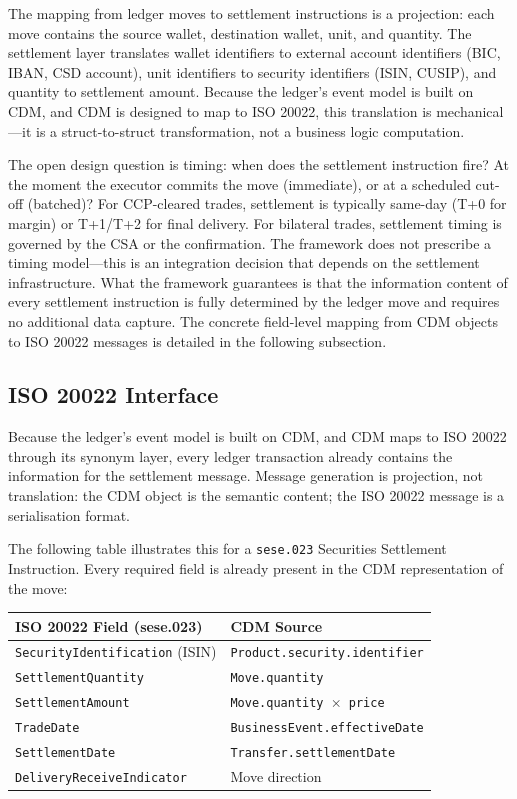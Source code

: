 \documentclass[11pt,a4paper]{article}
\begin{document}
The mapping from ledger moves to settlement instructions is a projection: each move contains the source wallet, destination wallet, unit, and quantity. The settlement layer translates wallet identifiers to external account identifiers (BIC, IBAN, CSD account), unit identifiers to security identifiers (ISIN, CUSIP), and quantity to settlement amount. Because the ledger's event model is built on CDM, and CDM is designed to map to ISO 20022, this translation is mechanical---it is a struct-to-struct transformation, not a business logic computation.

The open design question is timing: when does the settlement instruction fire? At the moment the executor commits the move (immediate), or at a scheduled cut-off (batched)? For CCP-cleared trades, settlement is typically same-day (T+0 for margin) or T+1/T+2 for final delivery. For bilateral trades, settlement timing is governed by the CSA or the confirmation. The framework does not prescribe a timing model---this is an integration decision that depends on the settlement infrastructure. What the framework guarantees is that the information content of every settlement instruction is fully determined by the ledger move and requires no additional data capture. The concrete field-level mapping from CDM objects to ISO 20022 messages is detailed in the following subsection.

\subsection{ISO 20022 Interface}

Because the ledger's event model is built on CDM, and CDM maps to ISO 20022 through its synonym layer, every ledger transaction already contains the information for the settlement message. Message generation is projection, not translation: the CDM object is the semantic content; the ISO 20022 message is a serialisation format.

The following table illustrates this for a \texttt{sese.023} Securities Settlement Instruction. Every required field is already present in the CDM representation of the move:

\begin{center}
\begin{tabular}{l l}
\toprule
\textbf{ISO 20022 Field (sese.023)} & \textbf{CDM Source} \\
\midrule
\texttt{SecurityIdentification} (ISIN) & \texttt{Product.security.identifier} \\
\texttt{SettlementQuantity} & \texttt{Move.quantity} \\
\texttt{SettlementAmount} & \texttt{Move.quantity $\times$ price} \\
\texttt{TradeDate} & \texttt{BusinessEvent.effectiveDate} \\
\texttt{SettlementDate} & \texttt{Transfer.settlementDate} \\
\texttt{DeliveryReceiveIndicator} & Move direction \\
\bottomrule
\end{tabular}
\end{center}
\end{document}
